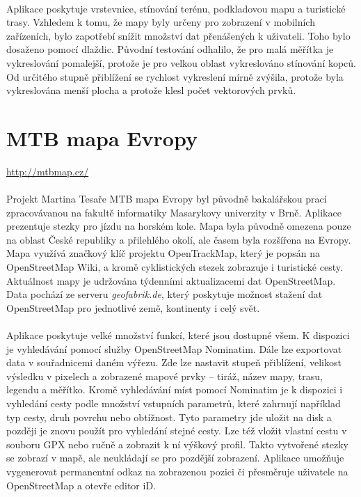 \documentclass[11pt,a4paper,titlepage,oneside]{book}
\begin{document}
		\paragraph{}  Aplikace poskytuje vrstevnice, stínování terénu, podkladovou mapu a turistické trasy. Vzhledem k tomu, že mapy byly určeny pro zobrazení v mobilních zařízeních, bylo zapotřebí snížit množství dat přenášených k uživateli. Toho bylo dosaženo pomocí dlaždic. Původní testování odhalilo, že pro malá měřítka je vykreslování pomalejší, protože je pro velkou oblast vykreslováno stínování kopců. Od určitého stupně přiblížení se rychlost vykreslení mírně zvýšila, protože byla vykreslována menší plocha a protože klesl počet vektorových prvků.

	\section{MTB mapa Evropy}
		\url{http://mtbmap.cz/}
		\paragraph{} Projekt Martina Tesaře MTB mapa Evropy byl původně bakalářskou prací zpracovávanou na fakultě informatiky Masarykovy univerzity v Brně. Aplikace prezentuje stezky pro jízdu na horském kole. Mapa byla původně omezena pouze na oblast České republiky a přilehlého okolí, ale časem byla rozšířena na Evropy. Mapa využívá značkový klíč projektu OpenTrackMap, který je popsán na OpenStreetMap Wiki\cite{otm_klic}, a kromě cyklistických stezek zobrazuje i turistické cesty. Aktuálnost mapy je udržována týdenními aktualizacemi dat OpenStreetMap. Data pochází ze serveru \textit{geofabrik.de}, který poskytuje možnost stažení dat OpenStreetMap pro jednotlivé země, kontinenty i celý svět.




		\paragraph{} Aplikace poskytuje velké množství funkcí, které jsou dostupné všem. K dispozici je vyhledávání pomocí služby OpenStreetMap Nominatim\cite{nominatim}. Dále lze exportovat data v souřadnicemi daném výřezu. Zde lze nastavit stupeň přiblížení, velikost výsledku v pixelech a zobrazené mapové prvky -- tiráž, název mapy, trasu, legendu a měřítko. Kromě vyhledávání míst  pomocí Nominatim je k dispozici i vyhledání cesty podle množství vstupních parametrů, které zahrnují například typ cesty, druh povrchu nebo obtížnost. Tyto parametry jde uložit na disk a později je znovu použít pro vyhledání stejné cesty. Lze též vložit vlastní cestu v souboru GPX nebo ručně a zobrazit k ní výškový profil. Takto vytvořené stezky se zobrazí v mapě, ale neukládají se pro pozdější zobrazení. Aplikace umožňuje vygenerovat permanentní odkaz na zobrazenou pozici či přesměruje uživatele na OpenStreetMap a otevře editor iD.
\end{document}
